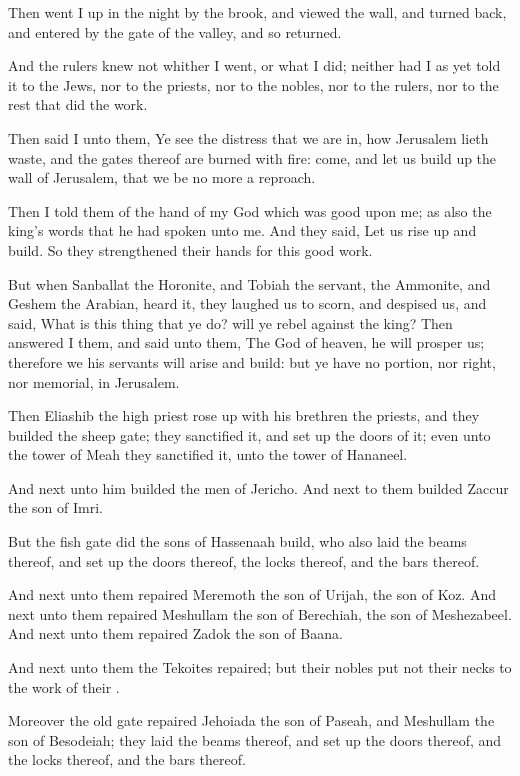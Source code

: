 \Verse Then went I up in the night by the brook, and viewed the wall, and turned back, and entered by the gate of the valley, and so returned.

\Verse And the rulers knew not whither I went, or what I did; neither had I as yet told it to the Jews, nor to the priests, nor to the nobles, nor to the rulers, nor to the rest that did the work.

\Verse Then said I unto them, Ye see the distress that we are in, how Jerusalem lieth waste, and the gates thereof are burned with fire: come, and let us build up the wall of Jerusalem, that we be no more a reproach.

\Verse Then I told them of the hand of my God which was good upon me; as also the king's words that he had spoken unto me. And they said, Let us rise up and build. So they strengthened their hands for this good work.

\Verse But when Sanballat the Horonite, and Tobiah the servant, the Ammonite, and Geshem the Arabian, heard it, they laughed us to scorn, and despised us, and said, What is this thing that ye do? will ye rebel against the king?  \Verse Then answered I them, and said unto them, The God of heaven, he will prosper us; therefore we his servants will arise and build: but ye have no portion, nor right, nor memorial, in Jerusalem.


\Chapter
\Verse Then Eliashib the high priest rose up with his brethren the priests, and they builded the sheep gate; they sanctified it, and set up the doors of it; even unto the tower of Meah they sanctified it, unto the tower of Hananeel.

\Verse And next unto him builded the men of Jericho. And next to them builded Zaccur the son of Imri.

\Verse But the fish gate did the sons of Hassenaah build, who also laid the beams thereof, and set up the doors thereof, the locks thereof, and the bars thereof.

\Verse And next unto them repaired Meremoth the son of Urijah, the son of Koz. And next unto them repaired Meshullam the son of Berechiah, the son of Meshezabeel. And next unto them repaired Zadok the son of Baana.

\Verse And next unto them the Tekoites repaired; but their nobles put not their necks to the work of their \LORD.

\Verse Moreover the old gate repaired Jehoiada the son of Paseah, and Meshullam the son of Besodeiah; they laid the beams thereof, and set up the doors thereof, and the locks thereof, and the bars thereof.

